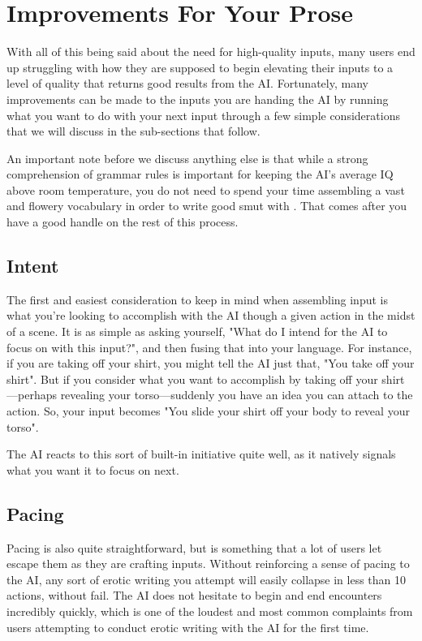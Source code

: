 ﻿\documentclass[Coomer-main.tex]{subfiles}
\begin{document}
\section{Improvements For Your Prose}

With all of this being said about the need for high-quality inputs, many users end up struggling with how they are supposed to begin elevating their inputs to a level of quality that returns good results from the AI. Fortunately, many improvements can be made to the inputs you are handing the AI by running what you want to do with your next input through a few simple considerations that we will discuss in the sub-sections that follow.

An important note before we discuss anything else is that while a strong comprehension of grammar rules is important for keeping the AI's average IQ above room temperature, you do not need to spend your time assembling a vast and flowery vocabulary in order to write good smut with \aid. That comes after you have a good handle on the rest of this process.

\subsection{Intent}

The first and easiest consideration to keep in mind when assembling input is what you're looking to accomplish with the AI though a given action in the midst of a scene. It is as simple as asking yourself, "What do I intend for the AI to focus on with this input?", and then fusing that into your language. For instance, if you are taking off your shirt, you might tell the AI just that, "You take off your shirt". But if you consider what you want to accomplish by taking off your shirt—perhaps revealing your torso—suddenly you have an idea you can attach to the action. So, your input becomes "You slide your shirt off your body to reveal your torso".

The AI reacts to this sort of built-in initiative quite well, as it natively signals what you want it to focus on next.

\subsection{Pacing}

Pacing is also quite straightforward, but is something that a lot of \aid users let escape them as they are crafting inputs. Without reinforcing a sense of pacing to the AI, any sort of erotic writing you attempt will easily collapse in less than 10 actions, without fail. The AI does not hesitate to begin and end encounters incredibly quickly, which is one of the loudest and most common complaints from users attempting to conduct erotic writing with the AI for the first time.
\end{document}
